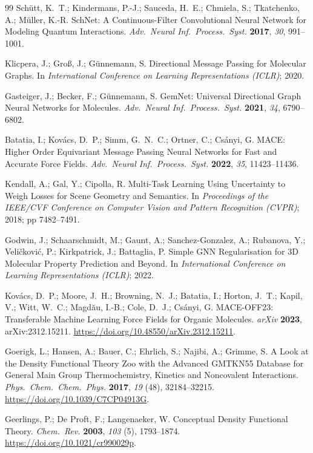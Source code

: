 \begin{thebibliography}{99}
Schütt, K.~T.; Kindermans, P.-J.; Sauceda, H.~E.; Chmiela, S.; Tkatchenko, A.; Müller, K.-R. SchNet: A Continuous-Filter Convolutional Neural Network for Modeling Quantum Interactions. \emph{Adv.~Neural Inf.~Process.~Syst.} \textbf{2017}, \emph{30}, 991--1001.

Klicpera, J.; Groß, J.; Günnemann, S. Directional Message Passing for Molecular Graphs. In \emph{International Conference on Learning Representations (ICLR)}; 2020.

Gasteiger, J.; Becker, F.; Günnemann, S. GemNet: Universal Directional Graph Neural Networks for Molecules. \emph{Adv.~Neural Inf.~Process.~Syst.} \textbf{2021}, \emph{34}, 6790--6802.

Batatia, I.; Kovács, D.~P.; Simm, G.~N.~C.; Ortner, C.; Csányi, G. MACE: Higher Order Equivariant Message Passing Neural Networks for Fast and Accurate Force Fields. \emph{Adv.~Neural Inf.~Process.~Syst.} \textbf{2022}, \emph{35}, 11423--11436.

Kendall, A.; Gal, Y.; Cipolla, R. Multi-Task Learning Using Uncertainty to Weigh Losses for Scene Geometry and Semantics. In \emph{Proceedings of the IEEE/CVF Conference on Computer Vision and Pattern Recognition (CVPR)}; 2018; pp 7482--7491.

Godwin, J.; Schaarschmidt, M.; Gaunt, A.; Sanchez-Gonzalez, A.; Rubanova, Y.; Veličković, P.; Kirkpatrick, J.; Battaglia, P. Simple GNN Regularisation for 3D Molecular Property Prediction and Beyond. In \emph{International Conference on Learning Representations (ICLR)}; 2022.

Kovács, D.~P.; Moore, J.~H.; Browning, N.~J.; Batatia, I.; Horton, J.~T.; Kapil, V.; Witt, W.~C.; Magdău, I.-B.; Cole, D.~J.; Csányi, G. MACE-OFF23: Transferable Machine Learning Force Fields for Organic Molecules. \emph{arXiv} \textbf{2023}, arXiv:2312.15211. \url{https://doi.org/10.48550/arXiv.2312.15211}.

Goerigk, L.; Hansen, A.; Bauer, C.; Ehrlich, S.; Najibi, A.; Grimme, S. A Look at the Density Functional Theory Zoo with the Advanced GMTKN55 Database for General Main Group Thermochemistry, Kinetics and Noncovalent Interactions. \emph{Phys.~Chem.~Chem.~Phys.} \textbf{2017}, \emph{19} (48), 32184--32215. \url{https://doi.org/10.1039/C7CP04913G}.

Geerlings, P.; De Proft, F.; Langenaeker, W. Conceptual Density Functional Theory. \emph{Chem.~Rev.} \textbf{2003}, \emph{103} (5), 1793--1874. \url{https://doi.org/10.1021/cr990029p}.


\end{thebibliography}
